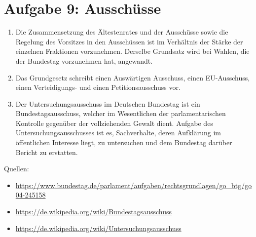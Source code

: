 \documentclass{article}
\begin{document}
	\section*{Aufgabe 9: Ausschüsse}
	\begin{enumerate}[label=(\alph*)]
		\item Die Zusammensetzung des Ältestenrates und der Ausschüsse sowie die Regelung des Vorsitzes in den Ausschüssen ist im Verhältnis der Stärke der einzelnen Fraktionen vorzunehmen. Derselbe Grundsatz wird bei Wahlen, die der Bundestag vorzunehmen hat, angewandt.
		\item Das Grundgesetz schreibt einen Auswärtigen Ausschuss, einen EU-Ausschuss, einen Verteidigungs- und einen Petitionsausschuss vor.
		\item Der Untersuchungsausschuss im Deutschen Bundestag ist ein Bundestagsausschuss, welcher im Wesent\-lichen der parlamentarischen Kontrolle gegenüber der vollziehenden Gewalt dient. Aufgabe des Untersuchungsausschusses ist es, Sachverhalte, deren Aufklärung im öffentlichen Interesse liegt, zu untersuchen und dem Bundestag darüber Bericht zu erstatten.
	\end{enumerate}

	Quellen:
	\begin{itemize}
		\item \url{https://www.bundestag.de/parlament/aufgaben/rechtsgrundlagen/go_btg/go04-245158}
		\item \url{https://de.wikipedia.org/wiki/Bundestagsausschuss}
		\item \url{https://de.wikipedia.org/wiki/Untersuchungsausschuss}
	\end{itemize}
\end{document}
